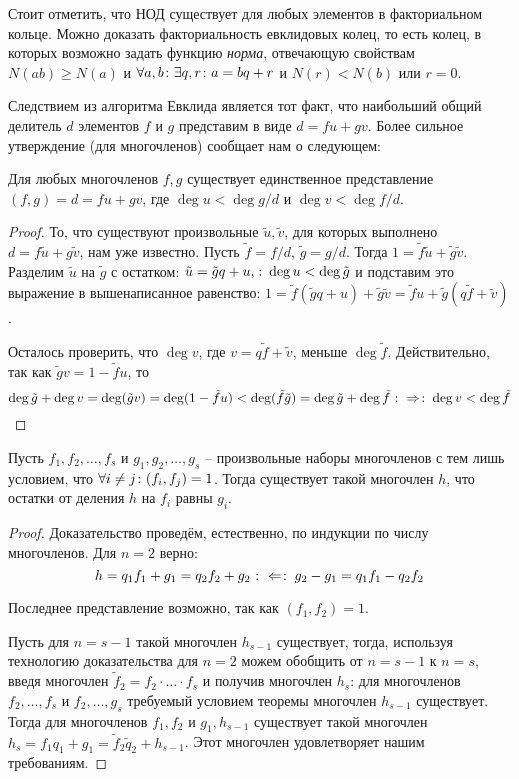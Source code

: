 Стоит отметить, что НОД существует для любых элементов в факториальном кольце. Можно доказать факториальность евклидовых колец, то есть колец, в которых возможно задать функцию \emph{норма}, отвечающую свойствам $N(ab)\ge N(a)$ и $\forall a,b\colon\exists q,r\colon a=bq+r$ и $N(r)<N(b)$ или $r=0$.

Следствием из алгоритма Евклида является тот факт, что наибольший общий делитель $d$ элементов $f$ и $g$ представим в виде $d=fu+gv$. Более сильное утверждение (для многочленов) сообщает нам о следующем:

\begin{theorem}
  Для любых многочленов $f,g$ существует единственное представление $(f,g)=d=fu+gv$, где $\deg u<\deg g/d$ и $\deg v<\deg f/d$.
\end{theorem}

\begin{proof}
То, что существуют произвольные $\tilde u,\tilde v$, для которых выполнено $d=f\tilde u+g\tilde v$, нам уже известно. Пусть $\tilde f=f/d$, $\tilde g=g/d$. Тогда $1=\tilde f\tilde u+\tilde g\tilde v$. Разделим $\tilde u$ на $\tilde g$ с остатком: $\tilde u=\tilde gq+u,\colon\deg u<\deg\tilde g$ и подставим это выражение в вышенаписанное равенство: $1=\tilde f(\tilde gq+u)+\tilde g\tilde v=\tilde fu+\tilde g(q\tilde f+\tilde v)$.

Осталось проверить, что $\deg v$, где $v=q\tilde f+\tilde v$, меньше $\deg \tilde f$. Действительно, так как $\tilde gv=1-\tilde fu$, то
$$\deg\tilde g+\deg v=\deg(\tilde gv)=\deg(1-\tilde fu)<\deg (\tilde f\tilde g)=\deg\tilde g+\deg\tilde f\mathbin{\colon\Rightarrow \colon} \deg v<\deg\tilde f$$
\end{proof}

\begin{theorem}[об остатках]
  Пусть $f_1,f_2,\dots,f_s$ и $g_1,g_2,\dots,g_s$ -- произвольные наборы многочленов с тем лишь условием, что $\forall i\ne j\colon (f_i,f_j)=1$. Тогда существует такой многочлен $h$, что остатки от деления $h$ на $f_i$ равны $g_i$.
\end{theorem}
\begin{proof}
  Доказательство проведём, естественно, по индукции по числу многочленов. Для $n=2$ верно: $$h=q_1f_1+g_1=q_2f_2+g_2\mathbin{\colon\Leftarrow \colon} g_2-g_1=q_1f_1-q_2f_2$$
  
  Последнее представление возможно, так как $(f_1,f_2)=1$.
  
  Пусть для $n=s-1$ такой многочлен $h_{s-1}$ существует, тогда, используя технологию доказательства для $n=2$ можем обобщить от $n=s-1$ к $n=s$, введя многочлен $\tilde f_2=f_2\cdot\dots\cdot f_s$ и получив многочлен $h_s$: для многочленов $f_2,\dots, f_s$ и $f_2,\dots , g_s$ требуемый условием теоремы многочлен $h_{s-1}$ существует. Тогда для многочленов $f_1,f_2$ и $g_1, h_{s-1}$ существует такой многочлен $h_s=f_1q_1+g_1=\tilde f_2\tilde q_2+h_{s-1}$. Этот многочлен удовлетворяет нашим требованиям. 
\end{proof}

